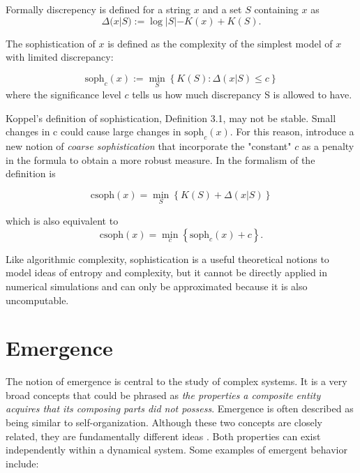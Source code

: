 Formally discrepency is defined for a string $x$ and a set $S$ containing $x$ as
\begin{equation}
  \label{eq:6}
  \Delta(x|S) := \log |S| - K(x) + K(S).
\end{equation}

The sophistication of $x$ is defined as the complexity of the simplest model of
$x$ with limited discrepancy:

\begin{equation}
  \label{eq:7}
  \text{soph}_{c}(x) := \min_{S}\left\{ K(S): \Delta(x|S) \leq c \right\}
\end{equation}
where the significance level $c$ tells us how much discrepancy S is allowed to have.

Koppel’s definition of sophistication, Definition 3.1, may not be stable. Small
changes in c could cause large changes in $\text{soph}_{c}(x)$. For this reason,
\textcite{antunesSophisticationRevisited2009} introduce a new notion of \emph{coarse
sophistication} that incorporate the "constant" $c$ as a penalty in the formula
to obtain a more robust measure.
In the formalism of \textcite{motaSophisticationRandomnessDeficiency2013} the
definition is

\begin{equation}
  \label{eq:8}
  \text{csoph}(x) = \min_{S}\left\{ K(S) + \Delta(x|S) \right\}
\end{equation}

which is also equivalent to
\begin{equation}
  \label{eq:8b}
  \text{csoph}(x) = \min_{c}\left\{ \text{soph}_{c}(x) + c \right\}.
\end{equation}

Like algorithmic complexity, sophistication is a useful theoretical notions to
model ideas of entropy and complexity, but it cannot be directly applied in
numerical simulations and can only be approximated because it is also
uncomputable.



\section{Emergence}\label{sec:emergence}
The notion of emergence is central to the study of complex systems. It is a very
broad concepts that could be phrased as \emph{the properties a composite entity
  acquires that its composing parts did not possess}. Emergence is often
described as being similar to self-organization. Although these two concepts are
closely related, they are fundamentally different ideas
\parencite{dewolfEmergenceSelfOrganisationDifferent2005}. Both properties can
exist independently within a dynamical system. Some examples of emergent
behavior include:

